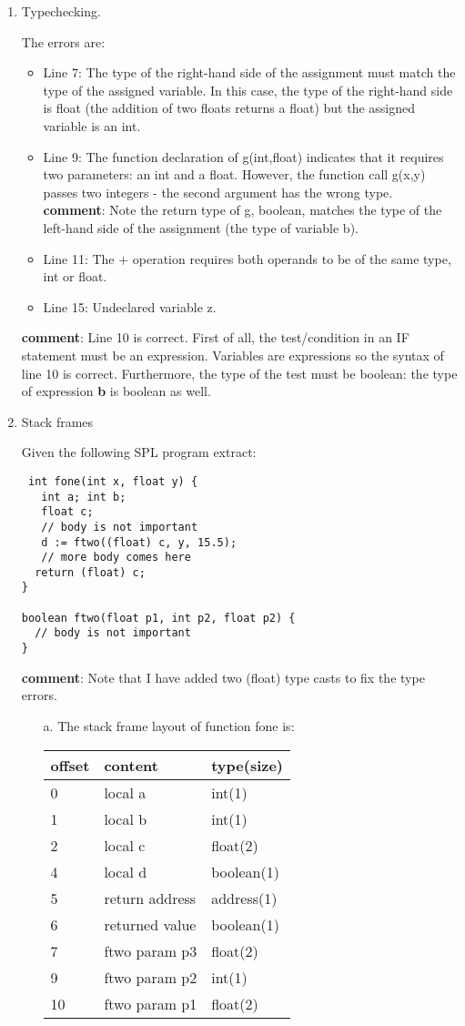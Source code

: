 \documentclass{article}
\newcommand{\comment}{\textbf{comment}}
\begin{document}
\begin{enumerate}
\item Typechecking.

The errors are:
\begin{itemize}
\item Line 7: The type of the right-hand side of the assignment must match the type of the assigned variable. In this case, the type of the right-hand side is float (the addition of two floats returns a float) but the assigned variable is an int.
\item Line 9: The function declaration of g(int,float) indicates that it requires two parameters: an int and a float. However, the function call g(x,y) passes two integers - the second argument has the wrong type.\\
\comment: Note the return type of g, boolean, matches the type of the left-hand side of the assignment (the type of variable b).
\item Line 11: The + operation requires both operands to be of the same type, int or float.
\item Line 15: Undeclared variable z.
\end{itemize}

\comment: Line 10 is correct. First of all, the test/condition in an IF statement
 must be an expression. Variables are expressions so the syntax of line 10 is correct. Furthermore, the type of the test must be boolean: the type of expression \textbf{b} is boolean as well.


\item Stack frames

Given the following SPL program extract:
\begin{verbatim}
 int fone(int x, float y) {
   int a; int b;
   float c;
   // body is not important
   d := ftwo((float) c, y, 15.5);
   // more body comes here
  return (float) c;
}

boolean ftwo(float p1, int p2, float p2) {
  // body is not important
}
\end{verbatim}

\comment: Note that I have added two (float) type casts to fix the type errors.

\begin{itemize}
\item[a.] The stack frame layout of function fone is:

\begin{tabular}{lll}
offset & content & type(size) \\
\hline 
0 & local a & int(1) \\
1 & local b & int(1) \\
2 & local c & float(2) \\
4 & local d & boolean(1) \\
5 & return address & address(1) \\
6 & returned value & boolean(1) \\
7 & ftwo param p3 & float(2) \\
9 & ftwo param p2 & int(1) \\
10 & ftwo param p1 & float(2)
\end{tabular}


\end{itemize}
\end{enumerate}
\end{document}
